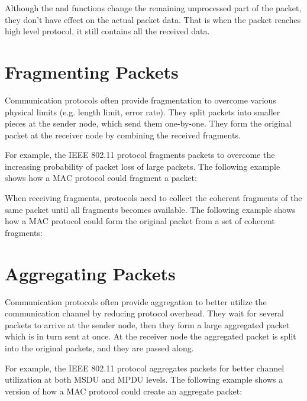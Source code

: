 
Although the  and  functions change the
remaining unprocessed part of the packet, they don't have effect on the actual
packet data. That is when the packet reaches high level protocol, it still
contains all the received data.

\section{Fragmenting Packets}
\label{sec:packets:fragmenting-packets}

Communication protocols often provide fragmentation to overcome various physical
limits (e.g. length limit, error rate). They split packets into smaller pieces
at the sender node, which send them one-by-one. They form the original packet at
the receiver node by combining the received fragments.

For example, the IEEE 802.11 protocol fragments packets to overcome the
increasing probability of packet loss of large packets. The following example
shows how a MAC protocol could fragment a packet:


When receiving fragments, protocols need to collect the coherent fragments of
the same packet until all fragments becomes available. The following example
shows how a MAC protocol could form the original packet from a set of coherent
fragments:


\section{Aggregating Packets}
\label{sec:packets:aggregating-packets}

Communication protocols often provide aggregation to better utilize the
communication channel by reducing protocol overhead. They wait for several
packets to arrive at the sender node, then they form a large aggregated packet
which is in turn sent at once. At the receiver node the aggregated packet is
split into the original packets, and they are passed along.

For example, the IEEE 802.11 protocol aggregates packets for better channel
utilization at both MSDU and MPDU levels. The following example shows a version
of how a MAC protocol could create an aggregate packet:

